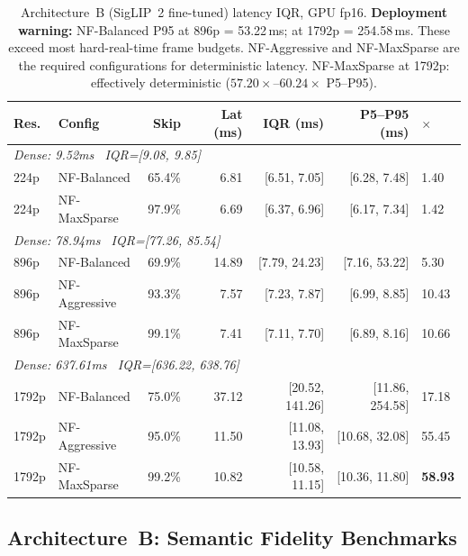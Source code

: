 \documentclass{article}
\begin{document}
\begin{table}[htbp]
\centering
\setlength{\tabcolsep}{4pt}
\renewcommand{\arraystretch}{1.10}
\begin{tabular}{llrrrrl}
\toprule
\textbf{Res.} & \textbf{Config} & \textbf{Skip}
  & \textbf{Lat (ms)} & \textbf{IQR (ms)} & \textbf{P5--P95 (ms)} & \textbf{$\times$} \\
\midrule
\multicolumn{7}{l}{\textit{Dense: 9.52ms \ IQR=[9.08, 9.85]}} \\
224p & NF-Balanced   & 65.4\% &  6.81 & [6.51, 7.05] & [6.28, 7.48]   & 1.40 \\
224p & NF-MaxSparse  & 97.9\% &  6.69 & [6.37, 6.96] & [6.17, 7.34]   & 1.42 \\
\midrule
\multicolumn{7}{l}{\textit{Dense: 78.94ms \ IQR=[77.26, 85.54]}} \\
896p & NF-Balanced   & 69.9\% & 14.89 & [7.79, 24.23]   & [7.16, 53.22]   & 5.30 \\
896p & NF-Aggressive & 93.3\% &  7.57 & [7.23, 7.87]    & [6.99, 8.85]    & 10.43 \\
896p & NF-MaxSparse  & 99.1\% &  7.41 & [7.11, 7.70]    & [6.89, 8.16]    & 10.66 \\
\midrule
\multicolumn{7}{l}{\textit{Dense: 637.61ms \ IQR=[636.22, 638.76]}} \\
1792p & NF-Balanced  & 75.0\% & 37.12 & [20.52, 141.26] & [11.86, 254.58] & 17.18 \\
1792p & NF-Aggressive& 95.0\% & 11.50 & [11.08, 13.93]  & [10.68, 32.08]  & 55.45 \\
1792p & NF-MaxSparse & 99.2\% & 10.82 & [10.58, 11.15]  & [10.36, 11.80]  & \textbf{58.93} \\
\bottomrule
\end{tabular}
\caption{Architecture~B (SigLIP~2 fine-tuned) latency IQR, GPU fp16.
\textbf{Deployment warning:} NF-Balanced P95 at 896p = 53.22\,ms; at
1792p = 254.58\,ms. These exceed most hard-real-time frame budgets.
NF-Aggressive and NF-MaxSparse are the required configurations for
deterministic latency. NF-MaxSparse at 1792p: effectively deterministic
($57.20\times$--$60.24\times$ P5--P95).}
\label{tab:arch-b-iqr}
\end{table}

\subsection{Architecture~B: Semantic Fidelity Benchmarks}
\label{sec:semantic-fidelity-benchmarks}
\label{sec:orthogonal-rotation}
\end{document}
